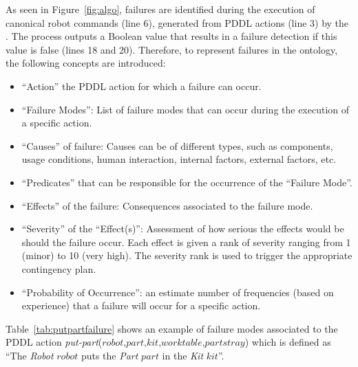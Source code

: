 As seen in Figure~\ref{fig:algo}, failures are identified during the execution of canonical robot commands (line 6), generated from PDDL actions (line 3) by the . The  process outputs a Boolean value that results in a failure detection if this value is false (lines 18 and 20). Therefore, to represent failures in the  ontology, the following concepts are introduced:
\begin{itemize}
 \item ``Action'' the PDDL action for which a failure can occur.
 \item ``Failure Modes'': List of failure modes that can occur during the execution of a specific action.
 \item ``Causes'' of failure: Causes can be of different types, such as  components, usage conditions, human interaction, internal factors, external factors, etc.
 \item ``Predicates'' that can be responsible for the occurrence of the ``Failure Mode''.
 \item ``Effects'' of the failure: Consequences associated to the failure mode.
 \item ``Severity'' of the ``Effect(s)'': Assessment of how serious the effects would be should the failure occur. Each effect is given a rank of severity ranging from 1 (minor) to 10 (very high). The severity rank is used to trigger the appropriate contingency plan.
 \item ``Probability of Occurrence'': an estimate number of frequencies (based on experience) that a failure will occur for a specific action.
\end{itemize}

Table~\ref{tab:putpartfailure} shows an example of failure modes associated to the PDDL action \textsl{put-part}($\mathit{robot}$,$\mathit{part}$,$\mathit{kit}$,$\mathit{worktable}$,$\mathit{partstray}$) which is defined as ``The \textit{Robot} $\mathit{robot}$ puts the \textit{Part} $\mathit{part}$ in the \textit{Kit} $\mathit{kit}$''.

